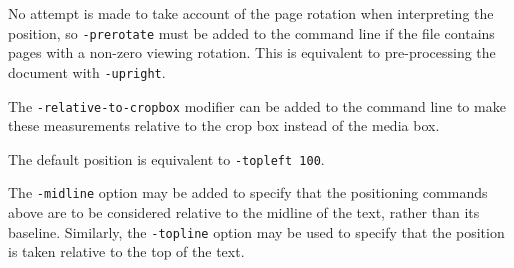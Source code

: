 \documentclass{book}
\begin{document}
\noindent{}



\noindent No attempt is made to take account of the page rotation when interpreting the
position, so \texttt{-prerotate} must be added to the command line if the file
contains pages with a non-zero viewing rotation. This is equivalent to
pre-processing the document with \texttt{-upright}.
   
The \texttt{-relative-to-cropbox} modifier can be added to the command line to
make these measurements relative to the crop box instead of the media box.

The default position is equivalent to \texttt{-topleft 100}.

The \texttt{-midline} option may be added to specify that the positioning
commands above are to be considered relative to the midline of the text, rather
than its baseline. Similarly, the \texttt{-topline} option may be used to specify that the position is taken relative to the top of the text.
\end{document}
